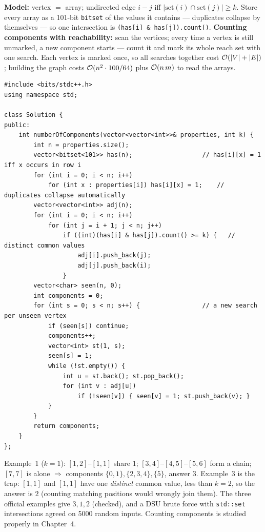 \begin{solutionbox}
\textbf{Model:} vertex $=$ array; undirected edge $i - j$ iff $|\mathrm{set}(i) \cap \mathrm{set}(j)| \ge k$. Store every array as a 101-bit \texttt{bitset} of the values it contains --- duplicates collapse by themselves --- so one intersection is \texttt{(has[i] \& has[j]).count()}. \textbf{Counting components with reachability:} scan the vertices; every time a vertex is still unmarked, a new component starts --- count it and mark its whole reach set with one search. Each vertex is marked once, so all searches together cost $\mathcal{O}(|V|+|E|)$; building the graph costs $\mathcal{O}(n^2 \cdot 100/64)$ plus $\mathcal{O}(n\,m)$ to read the arrays.
\begin{lstlisting}[style=cpp]
#include <bits/stdc++.h>
using namespace std;

class Solution {
public:
    int numberOfComponents(vector<vector<int>>& properties, int k) {
        int n = properties.size();
        vector<bitset<101>> has(n);                   // has[i][x] = 1 iff x occurs in row i
        for (int i = 0; i < n; i++)
            for (int x : properties[i]) has[i][x] = 1;    // duplicates collapse automatically
        vector<vector<int>> adj(n);
        for (int i = 0; i < n; i++)
            for (int j = i + 1; j < n; j++)
                if ((int)(has[i] & has[j]).count() >= k) {   // distinct common values
                    adj[i].push_back(j);
                    adj[j].push_back(i);
                }
        vector<char> seen(n, 0);
        int components = 0;
        for (int s = 0; s < n; s++) {                 // a new search per unseen vertex
            if (seen[s]) continue;
            components++;
            vector<int> st(1, s);
            seen[s] = 1;
            while (!st.empty()) {
                int u = st.back(); st.pop_back();
                for (int v : adj[u])
                    if (!seen[v]) { seen[v] = 1; st.push_back(v); }
            }
        }
        return components;
    }
};
\end{lstlisting}
Example~1 ($k = 1$): $[1,2]$--$[1,1]$ share 1; $[3,4]$--$[4,5]$--$[5,6]$ form a chain; $[7,7]$ is alone $\Rightarrow$ components $\{0,1\}, \{2,3,4\}, \{5\}$, answer $3$. Example~3 is the trap: $[1,1]$ and $[1,1]$ have one \emph{distinct} common value, less than $k = 2$, so the answer is $2$ (counting matching positions would wrongly join them). The three official examples give $3, 1, 2$ (checked), and a DSU brute force with \texttt{std::set} intersections agreed on 5000 random inputs. Counting components is studied properly in Chapter~4.
\end{solutionbox}
